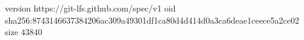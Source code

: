 version https://git-lfs.github.com/spec/v1
oid sha256:8743146637384206ac309a49301df1ca80d4d414d0a3ca6deae1ceece5a2ce02
size 43840

